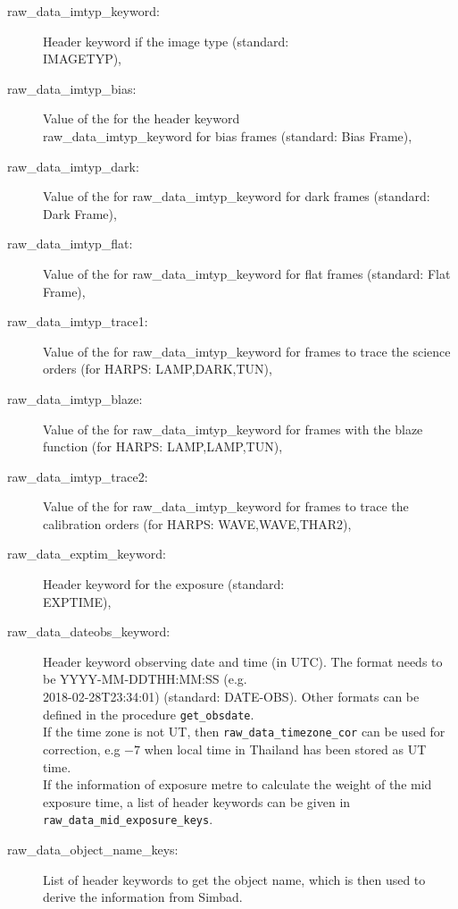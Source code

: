 \documentclass[10pt,a4paper]{article}
\begin{document}
\begin{description}
  \item[raw\_data\_imtyp\_keyword:] Header keyword if the image type (standard: \\ \mbox{IMAGETYP}),
  \item[raw\_data\_imtyp\_bias:] Value of the for the header keyword \\ raw\_data\_imtyp\_keyword for bias frames (standard: Bias Frame),
  \item[raw\_data\_imtyp\_dark:] Value of the for raw\_data\_imtyp\_keyword for dark frames (standard: Dark Frame),
  \item[raw\_data\_imtyp\_flat:] Value of the for raw\_data\_imtyp\_keyword for flat frames (standard: Flat Frame),
  \item[raw\_data\_imtyp\_trace1:] Value of the for raw\_data\_imtyp\_keyword for frames to trace the science orders (for HARPS: LAMP,DARK,TUN),
  \item[raw\_data\_imtyp\_blaze:] Value of the for raw\_data\_imtyp\_keyword for frames with the blaze function (for HARPS: LAMP,LAMP,TUN),
  \item[raw\_data\_imtyp\_trace2:] Value of the for raw\_data\_imtyp\_keyword for frames to trace the calibration orders (for HARPS: WAVE,WAVE,THAR2),
  \item[raw\_data\_exptim\_keyword:] Header keyword for the exposure (standard: \\ \mbox{EXPTIME}),
  \item[raw\_data\_dateobs\_keyword:] Header keyword observing date and time (in UTC). The format needs to be \mbox{YYYY-MM-DDTHH:MM:SS} (e.g. \\ \mbox{2018-02-28T23:34:01})  (standard: \mbox{DATE-OBS}). Other formats can be defined in the procedure \verb|get_obsdate|. \\
    If the time zone is not UT, then \verb|raw_data_timezone_cor| can be used for correction, e.g $-7$ when local time in Thailand has been stored as UT time.\\
    If the information of exposure metre to calculate the weight of the mid exposure time, a list of header keywords can be given in \verb|raw_data_mid_exposure_keys|.
  \item[raw\_data\_object\_name\_keys:] List of header keywords to get the object name, which is then used to derive the information from Simbad.
\end{description}
\end{document}
